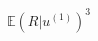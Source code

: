 \documentclass[preview]{standalone}
\begin{document}
\begin{align*}
\mathbb{E}(R| u^{(1)})^{3}
\end{align*}
\end{document}
